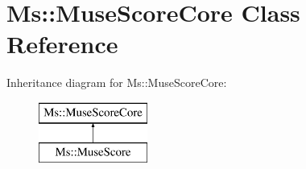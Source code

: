 \hypertarget{class_ms_1_1_muse_score_core}{}\section{Ms\+:\+:Muse\+Score\+Core Class Reference}
\label{class_ms_1_1_muse_score_core}
Inheritance diagram for Ms\+:\+:Muse\+Score\+Core\+:\begin{figure}[H]
\begin{center}
\leavevmode
\includegraphics[height=2.000000cm]{class_ms_1_1_muse_score_core}
\end{center}
\end{figure}
